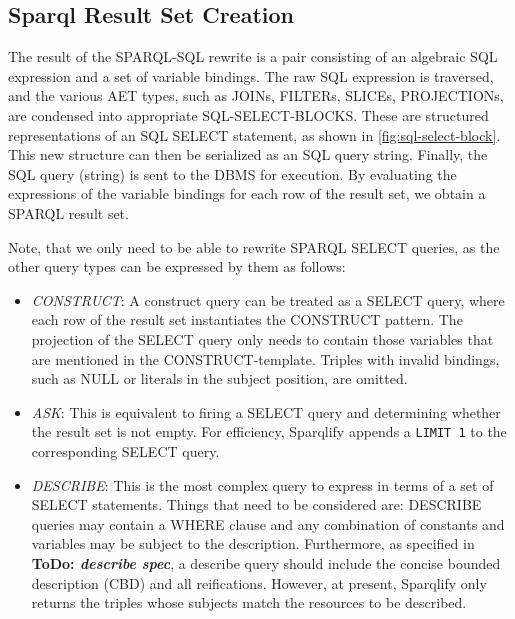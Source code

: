 \documentclass[a4paper,twoside,bibtotoc,abstracton,12pt,BCOR=15mm]{scrreprt}
\newcommand{\todo}[1]{\textbf{ToDo: \textit{#1}}}
\begin{document}
  



\subsection{Sparql Result Set Creation}
The result of the SPARQL-SQL rewrite is a pair consisting of an algebraic SQL expression and a set of variable bindings.
The raw SQL expression is traversed, and the various AET types, such as JOINs, FILTERs, SLICEs, PROJECTIONs, are
condensed into appropriate SQL-SELECT-BLOCKS. These are structured representations of an SQL SELECT statement, as shown in \autoref{fig:sql-select-block}.
This new structure can then be serialized as an SQL query string. Finally, the SQL query (string) is sent to the DBMS for execution.
By evaluating the expressions of the variable bindings for each row of the result set, we obtain a SPARQL result set.  

Note, that we only need to be able to rewrite SPARQL SELECT queries, as the other query types can be expressed by  them as follows:

\begin{itemize}
\item \emph{CONSTRUCT}: A construct query can be treated as a SELECT query, where each row of the result set instantiates the CONSTRUCT pattern.
	The projection of the SELECT query only needs to contain those variables that are mentioned in the CONSTRUCT-template.
	Triples with invalid bindings, such as NULL or literals in the subject position, are omitted.
\item \emph{ASK}: This is equivalent to firing a SELECT query and determining whether the result set is not empty. 
	For efficiency, Sparqlify appends a \texttt{LIMIT 1} to the corresponding SELECT query. 
\item \emph{DESCRIBE}: This is the most complex query to express in terms of a set of SELECT statements. 
	Things that need to be considered are: DESCRIBE queries may contain a WHERE clause and any combination of constants and variables may be subject to the description.
	Furthermore, as specified in \todo{describe spec}, a describe query should include the concise bounded description (CBD) and all reifications.
	However, at present, Sparqlify only returns the triples whose subjects match the resources to be described.    
\end{itemize}
\end{document}
